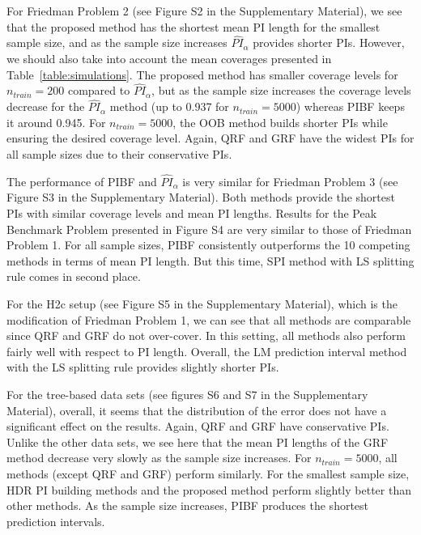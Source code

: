 For Friedman Problem 2 (see Figure S2 in the Supplementary Material), we see that the proposed method has the shortest mean PI length for the smallest sample size, and as the sample size increases $\widehat{PI}_\alpha$ provides shorter PIs. However, we should also take into account the mean coverages presented in Table~\ref{table:simulations}. The proposed method has smaller coverage levels for $n_{train}=200$ compared to $\widehat{PI}_\alpha$, but as the sample size increases the coverage levels decrease for the $\widehat{PI}_\alpha$ method (up to 0.937 for $n_{train}=5000$) whereas PIBF keeps it around 0.945. For $n_{train}=5000$, the OOB method builds shorter PIs while ensuring the desired coverage level. Again, QRF and GRF have the widest PIs for all sample sizes due to their conservative PIs.

The performance of PIBF and $\widehat{PI}_\alpha$ is very similar for Friedman Problem 3 (see Figure S3 in the Supplementary Material). Both methods provide the shortest PIs with similar coverage levels and mean PI lengths. Results for the Peak Benchmark Problem presented in Figure S4 are very similar to those of Friedman Problem 1. For all sample sizes, PIBF consistently outperforms the 10 competing methods in terms of mean PI length. But this time, SPI method with LS splitting rule comes in second place.

For the H2c setup (see Figure S5 in the Supplementary Material), which is the modification of Friedman Problem 1, we can see that all methods are comparable since QRF and GRF do not over-cover. In this setting, all methods also perform fairly well with respect to PI length. Overall, the LM prediction interval method with the LS splitting rule provides slightly shorter PIs.

For the tree-based data sets (see figures S6 and S7 in the Supplementary Material), overall, it seems that the distribution of the error does not have a significant effect on the results. Again, QRF and GRF have conservative PIs. Unlike the other data sets, we see here that the mean PI lengths of the GRF method decrease very slowly as the sample size increases. For $n_{train}=5000$, all methods (except QRF and GRF) perform similarly. For the smallest sample size, HDR PI building methods and the proposed method perform slightly better than other methods. As the sample size increases, PIBF produces the shortest prediction intervals.

